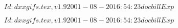 \documentclass{article}
\begin{document}
$Id: dxxgifs.tex,v 1.9 2001-08-20 16:54:23 docbill Exp $


\pagebreak


$Id: dxxgifs.tex,v 1.9 2001-08-20 16:54:23 docbill Exp $


\pagebreak
\end{document}
